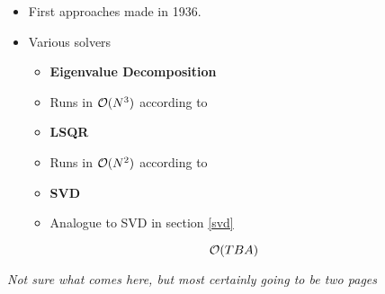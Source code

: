 \begin{itemize}
	\item First approaches made in 1936. \cite{fisher1936use}
	\item Various solvers
	\begin{itemize}
		\item \textbf{Eigenvalue Decomposition}
		\item Runs in $\mathcal{O}(N^3)$ according to \cite{cai2008training}
	\end{itemize}
	\begin{itemize}
		\item \textbf{LSQR}
		\item Runs in $\mathcal{O}(N^2)$ according to \cite{di2013new}
	\end{itemize}
		\begin{itemize}
		\item \textbf{SVD}
		\item Analogue to SVD in section \ref{svd}
	\end{itemize}
\end{itemize}

$$\mathcal{O}(TBA)$$

\clearpage


\begin{center}
	\textit{Not sure what comes here, but most certainly going to be two pages}
\end{center}
